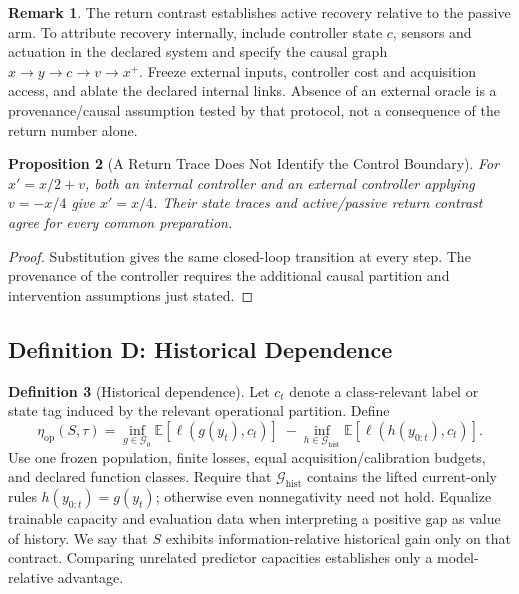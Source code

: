 \documentclass[11pt,a4paper]{article}
\newtheorem{proposition}{Proposition}[section]
\theoremstyle{definition}
\newtheorem{definition}[proposition]{Definition}
\newtheorem{remark}[proposition]{Remark}
\newcommand{\HistDep}{\eta_{\mathrm{op}}}
\begin{document}
\begin{remark}
The return contrast establishes active recovery relative to the passive arm. To attribute recovery internally, include controller state $c$, sensors and actuation in the declared system and specify the causal graph $x\to y\to c\to v\to x^+$. Freeze external inputs, controller cost and acquisition access, and ablate the declared internal links. Absence of an external oracle is a provenance/causal assumption tested by that protocol, not a consequence of the return number alone.
\end{remark}

\begin{proposition}[A Return Trace Does Not Identify the Control Boundary]\label{prop:feedback-boundary-nonidentifiability}
For $x'=x/2+v$, both an internal controller and an external controller applying $v=-x/4$ give $x'=x/4$. Their state traces and active/passive return contrast agree for every common preparation.
\end{proposition}
\begin{proof}
Substitution gives the same closed-loop transition at every step. The provenance of the controller requires the additional causal partition and intervention assumptions just stated.
\end{proof}

\subsection{Definition D: Historical Dependence}
\begin{definition}[Historical dependence]\label{def:historical-dependence}
Let $c_t$ denote a class-relevant label or state tag induced by the relevant operational partition. Define
\[
\HistDep(S,\tau)
=
\inf_{g\in \mathcal{G}_0}
\mathbb{E}\!\left[\ell(g(y_t),c_t)\right]
\;-
\inf_{h\in \mathcal{G}_{\mathrm{hist}}}
\mathbb{E}\!\left[\ell(h(y_{0:t}),c_t)\right].
\]
Use one frozen population, finite losses, equal acquisition/calibration budgets, and declared function classes. Require that $\mathcal G_{\mathrm{hist}}$ contains the lifted current-only rules $h(y_{0:t})=g(y_t)$; otherwise even nonnegativity need not hold. Equalize trainable capacity and evaluation data when interpreting a positive gap as value of history. We say that $S$ exhibits information-relative historical gain only on that contract. Comparing unrelated predictor capacities establishes only a model-relative advantage.
\end{definition}
\end{document}
